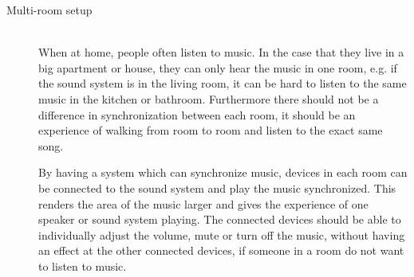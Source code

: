 \begin{description}
    \item[Multi-room setup] \hfill\\
        When at home, people often listen to music.
        In the case that they live in a big apartment or house, they can only hear the music in one room,
        e.g. if the sound system is in the living room, it can be hard to listen to the same music in the kitchen or bathroom.
        Furthermore there should not be a difference in synchronization between each room,
        it should be an experience of walking from room to room and listen to the exact same song.

        By having a system which can synchronize music, devices in each room can be connected to the sound system and play the music synchronized.
        This renders the area of the music larger and gives the experience of one speaker or sound system playing.
        The connected devices should be able to individually adjust the volume, mute or turn off the music,
        without having an effect at the other connected devices, if someone in a room do not want to listen to music. 


\end{description}








